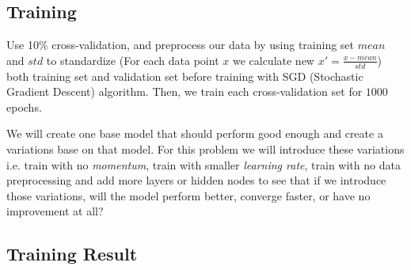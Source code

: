 \documentclass{article}
\begin{document}
\subsection*{Training}
Use 10\% cross-validation, and preprocess our data by using training set $mean$ 
and $std$ to standardize (For each data point $x$ we calculate new 
$x' = \frac{x - mean}{std}$) both training set and validation set before 
training with SGD (Stochastic Gradient Descent) algorithm. 
Then, we train each cross-validation set for $1000$ epochs.

We will create one base model that should perform good enough 
and create a variations base on that model. For this problem we will introduce these variations
i.e. train with no \emph{momentum}, train with smaller \emph{learning rate}, train with no data preprocessing 
and add more layers or hidden nodes to see that if we introduce those variations, 
will the model perform better, converge faster, or have no improvement at all?

\subsection*{Training Result}
\end{document}
